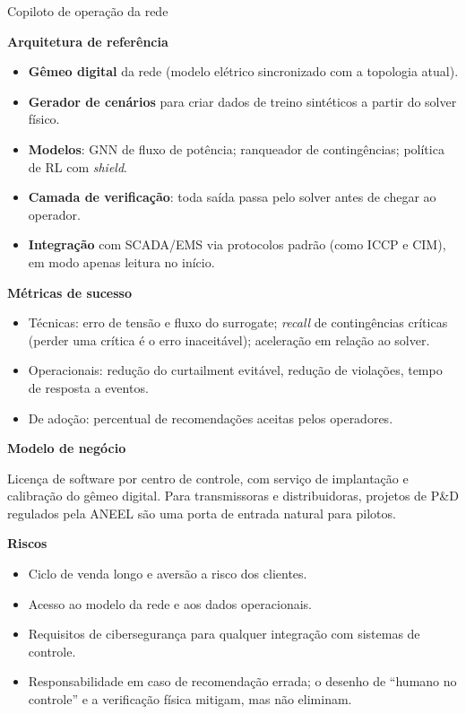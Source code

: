 \documentclass[10pt,a4paper,oneside]{article}
\newcommand{\prodsec}[1]{\par\medskip\noindent\textbf{\color{prodcolor}#1}\par\smallskip}
\begin{document}
\begin{produto}{Copiloto de operação da rede}
\prodsec{Arquitetura de referência}
\begin{itemize}
  \item \textbf{Gêmeo digital} da rede (modelo elétrico sincronizado com a
    topologia atual).
  \item \textbf{Gerador de cenários} para criar dados de treino sintéticos a
    partir do solver físico.
  \item \textbf{Modelos}: GNN de fluxo de potência; ranqueador de
    contingências; política de RL com \textit{shield}.
  \item \textbf{Camada de verificação}: toda saída passa pelo solver antes de
    chegar ao operador.
  \item \textbf{Integração} com SCADA/EMS via protocolos padrão (como ICCP e
    CIM), em modo apenas leitura no início.
\end{itemize}

\prodsec{Métricas de sucesso}
\begin{itemize}
  \item Técnicas: erro de tensão e fluxo do surrogate; \textit{recall} de
    contingências críticas (perder uma crítica é o erro inaceitável);
    aceleração em relação ao solver.
  \item Operacionais: redução do curtailment evitável, redução de violações,
    tempo de resposta a eventos.
  \item De adoção: percentual de recomendações aceitas pelos operadores.
\end{itemize}

\prodsec{Modelo de negócio}
Licença de software por centro de controle, com serviço de implantação e
calibração do gêmeo digital. Para transmissoras e distribuidoras, projetos de
P\&D regulados pela ANEEL são uma porta de entrada natural para pilotos.

\prodsec{Riscos}
\begin{itemize}
  \item Ciclo de venda longo e aversão a risco dos clientes.
  \item Acesso ao modelo da rede e aos dados operacionais.
  \item Requisitos de cibersegurança para qualquer integração com sistemas de
    controle.
  \item Responsabilidade em caso de recomendação errada; o desenho de
    ``humano no controle'' e a verificação física mitigam, mas não eliminam.
\end{itemize}
\end{produto}
\end{document}
